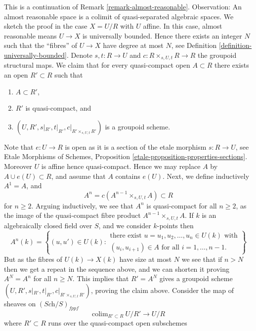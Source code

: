 \begin{remark}
\label{remark-fun-property-almost-reasonable}
This is a continuation of Remark \ref{remark-almost-reasonable}.
Observation: An almost reasonable space is a colimit of quasi-separated
algebraic spaces. We sketch the proof in the case $X = U/R$ with $U$ affine.
In this case, almost reasonable means $U \to X$ is universally bounded.
Hence there exists an integer $N$ such that the ``fibres'' of $U \to X$
have degree at most $N$, see Definition \ref{definition-universally-bounded}.
Denote $s, t : R \to U$ and $c : R \times_{s, U, t} R \to R$ the
groupoid structural maps.
We claim that for every quasi-compact open $A \subset R$ there exists
an open $R' \subset R$ such that
\begin{enumerate}
\item $A \subset R'$,
\item $R'$ is quasi-compact, and
\item $(U, R', s|_{R'}, t|_{R'}, c|_{R' \times_{s, U, t} R'})$ is
a groupoid scheme.
\end{enumerate}
Note that $e : U \to R$ is open as it is a section of the etale morphism
$s : R \to U$, see
Etale Morphisms of Schemes,
Proposition \ref{etale-proposition-properties-sections}. Moreover
$U$ is affine hence quasi-compact. Hence we may replace $A$ by
$A \cup e(U) \subset R$, and assume that $A$ contains $e(U)$. Next, we
define inductively $A^1 = A$, and
$$
A^n = c(A^{n - 1} \times_{s, U, t} A) \subset R
$$
for $n \geq 2$. Arguing inductively, we see that $A^n$ is quasi-compact for
all $n \geq 2$, as the image of the quasi-compact fibre product
$A^{n - 1} \times_{s, U, t} A$. If $k$ is an algebraically
closed field over $S$, and we consider $k$-points then
$$
A^n(k) = \left\{(u, u') \in U(k)
:
\begin{matrix}
\text{there exist } u = u_1, u_2, \ldots, u_n \in U(k)\text{ with} \\
(u_i , u_{i + 1}) \in A \text{ for all }i = 1, \ldots, n - 1.
\end{matrix}
\right\}
$$
But as the fibres of $U(k) \to X(k)$ have size at most $N$ we see that if
$n > N$ then we get a repeat in the sequence above, and we can shorten it
proving $A^N = A^n$ for all $n \geq N$.
This implies that $R' = A^N$ gives a groupoid scheme
$(U, R', s|_{R'}, t|_{R'}, c|_{R' \times_{s, U, t} R'})$, proving the claim
above. Consider the map of sheaves on $(\textit{Sch}/S)_{fppf}$
$$
\text{colim}_{R' \subset R}\ U/R' \longrightarrow U/R
$$
where $R' \subset R$ runs over the quasi-compact open subschemes

\end{remark}
